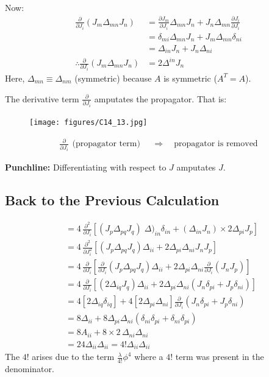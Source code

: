 \documentclass[14pt]{article} %
\begin{document}
Now:
\begin{align*}
\frac{\partial}{\partial J_i} (J_m \Delta_{mn} J_n) 
&= \frac{\partial J_m}{\partial J_i} \Delta_{mn} J_n + J_n \Delta_{mn} \frac{\partial J_i}{\partial J_i} \\
&= \delta_{mi} \Delta_{mn} J_n + J_m \Delta_{mn} \delta_{ni} \\
&= \Delta_{i n} J_n +  J_n \Delta_{ni} \\
\therefore \frac{\partial}{\partial J_i} (J_m \Delta_{mn} J_n)  &= 2 \Delta^{i n} J_n
\end{align*}
Here, $\Delta_{mn} \equiv \Delta_{nm}$ (symmetric) because $A$ is symmetric
($A^T = A$).

The derivative term $\frac{\partial}{\partial J_i}$ amputates the propagator.  
That is:
\begin{figure}[H]
    \centering
    \texttt{[image: figures/C14\_13.jpg]}
    \caption*{}
    \label{fig:placeholder}
\end{figure}
\vspace{-2cm}
\begin{align*}
\frac{\partial}{\partial J_i}
\begin{matrix}
\text{(propagator term)}
\end{matrix}
\quad \Rightarrow \quad \text{propagator is removed}
\end{align*}
\begin{framed}
\textbf{Punchline:} Differentiating with respect to $J$ amputates $J$.
\end{framed}

\subsection*{Back to the Previous Calculation}
\begin{align*}
&= 4 \, \frac{\partial^2}{\partial J_{i}}
\left[ (J_p \Delta_{pq} J_q) \; \Delta)_{i n} \delta_{in}
+ (\Delta_{in} J_n)\times 2\Delta_{pi} J_p \right]
\\
&= 4 \, \frac{\partial^2}{\partial J_{i}^2} 
\left[ (J_p \Delta_{pq} J_q) \Delta_{ii} + 2 \Delta_{pi} \Delta_{ni} J_n J_p \right]
\\
&= 4 \, \frac{\partial}{\partial J_{i}} 
\left[ \frac{\partial}{\partial J_{i}} (J_p \Delta_{pq} J_q) \Delta_{ii} + 2 \Delta_{pi} \Delta_{ni} \frac{\partial}{\partial J_{i}} (J_n J_p) \right]
\\
&= 4 \, \frac{\partial}{\partial J_{i}} \left[ (2 \Delta_{iq} J_q) \Delta_{ii} + 2 \Delta_{pi} \Delta_{ni} (J_n \delta_{pi} +J_p \delta_{ni}  ) \right]
\\
&= 4 \left[ 2 \Delta_{iq} \delta_{iq} \right] + 4 [2 \Delta_{pi} \Delta_{ni}] \frac{\partial}{\partial J_i} (J_n \delta_{pi} + J_p \delta_{ni} )
\\
&= 8 \Delta_{ii} + 8 \Delta_{pi} \Delta_{ni} (\delta_{ni} \delta_{pi} + \delta_{ni} \delta_{pi})
\\
&= 8 A_{ii} + 8 \times 2 \, \Delta_{ni} \Delta_{ni}
\\
&= 24 \Delta_{ii} \Delta_{ii} = 4! \Delta_{ii}\Delta_{ii} 
\end{align*}
The $4!$ arises due to the term $\frac{\lambda}{4!}\phi^4$ where a $4!$ term was present in the denominator.
\newpage
\end{document}
